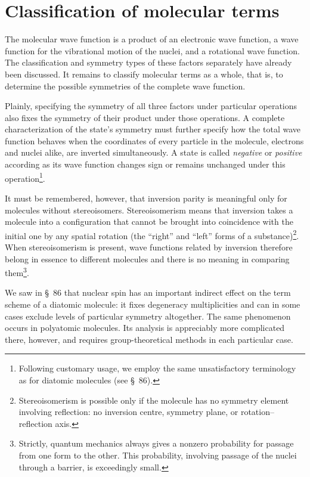 \section{Classification of molecular terms}

The molecular wave function is a product of an electronic wave function, a wave function for the vibrational motion of the nuclei, and a rotational wave function. The classification and symmetry types of these factors separately have already been discussed. It remains to classify molecular terms as a whole, that is, to determine the possible symmetries of the complete wave function.

Plainly, specifying the symmetry of all three factors under particular operations also fixes the symmetry of their product under those operations. A complete characterization of the state's symmetry must further specify how the total wave function behaves when the coordinates of every particle in the molecule, electrons and nuclei alike, are inverted simultaneously. A state is called \emph{negative} or \emph{positive} according as its wave function changes sign or remains unchanged under this operation\footnote{Following customary usage, we employ the same unsatisfactory terminology as for diatomic molecules (see \S~86).}.

It must be remembered, however, that inversion parity is meaningful only for molecules without stereoisomers. Stereoisomerism means that inversion takes a molecule into a configuration that cannot be brought into coincidence with the initial one by any spatial rotation (the ``right'' and ``left'' forms of a substance)\footnote{Stereoisomerism is possible only if the molecule has no symmetry element involving reflection: no inversion centre, symmetry plane, or rotation--reflection axis.}. When stereoisomerism is present, wave functions related by inversion therefore belong in essence to different molecules and there is no meaning in comparing them\footnote{Strictly, quantum mechanics always gives a nonzero probability for passage from one form to the other. This probability, involving passage of the nuclei through a barrier, is exceedingly small.}.

We saw in \S~86 that nuclear spin has an important indirect effect on the term scheme of a diatomic molecule: it fixes degeneracy multiplicities and can in some cases exclude levels of particular symmetry altogether. The same phenomenon occurs in polyatomic molecules. Its analysis is appreciably more complicated there, however, and requires group-theoretical methods in each particular case.

